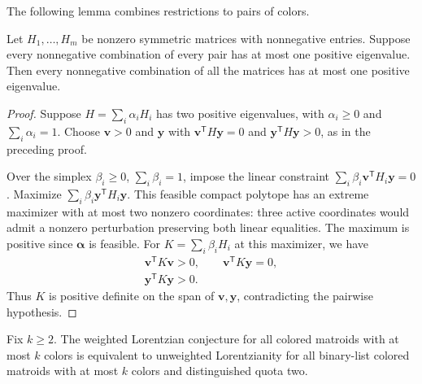 The following lemma combines restrictions to pairs of colors.

\begin{lemma}
Let $H_1,\dotsc,H_m$ be nonzero symmetric matrices with nonnegative
entries. Suppose every nonnegative combination of every pair has at
most one positive eigenvalue. Then every nonnegative combination of
all the matrices has at most one positive eigenvalue.
\end{lemma}

\begin{proof}
Suppose $H=\sum_i\alpha_iH_i$ has two positive eigenvalues, with
$\alpha_i\geq0$ and $\sum_i\alpha_i=1$. Choose $\mathbf v>0$ and
$\mathbf y$ with $\mathbf v^{\mathsf T}H\mathbf y=0$ and
$\mathbf y^{\mathsf T}H\mathbf y>0$, as in the preceding proof.

Over the simplex $\beta_i\geq0$, $\sum_i\beta_i=1$, impose the linear
constraint $\sum_i\beta_i\mathbf v^{\mathsf T}H_i\mathbf y=0$.
Maximize $\sum_i\beta_i\mathbf y^{\mathsf T}H_i\mathbf y$.
This feasible compact polytope has an extreme maximizer with at most
two nonzero coordinates: three active coordinates would admit a
nonzero perturbation preserving both linear equalities.
The maximum is positive since $\boldsymbol\alpha$ is feasible.
For $K=\sum_i\beta_iH_i$ at this maximizer, we have
\[
 \begin{gathered}
 \mathbf v^{\mathsf T}K\mathbf v>0,\qquad
 \mathbf v^{\mathsf T}K\mathbf y=0,\\
 \mathbf y^{\mathsf T}K\mathbf y>0.
 \end{gathered}
\]
Thus $K$ is positive definite on the span of $\mathbf v,\mathbf y$,
contradicting the pairwise hypothesis.
\end{proof}

\begin{theorem}
Fix $k\geq2$. The weighted Lorentzian conjecture for all colored
matroids with at most $k$ colors is equivalent to unweighted
Lorentzianity for all binary-list colored matroids with at most $k$
colors and distinguished quota two.
\end{theorem}


